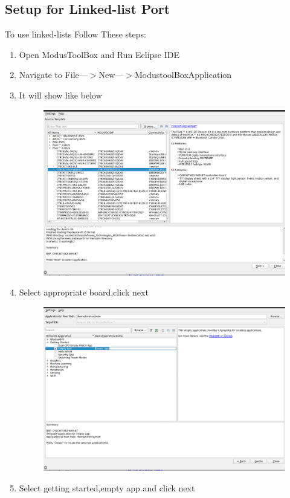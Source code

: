 \documentclass[journal,5pt,twocolumn]{IEEEtran}
\begin{document}
\subsection{\textbf{Setup for Linked-list Port}}
To use linked-lists Follow These steps:
\begin{enumerate}
\item Open ModusToolBox and Run Eclipse IDE
\item Navigate to File---$>$New---$>$ModustoolBoxApplication
\item It will show like below
\begin{figure}[h]
\includegraphics[width=\columnwidth]{../figs/modus.png}  
\end{figure}
\vspace{10mm}
\item Select appropriate board,click next
\begin{figure}[h]
\includegraphics[width=\columnwidth]{../figs/m1.png}  
\end{figure}
\item Select getting started,empty app and click next
\vspace{10mm}
\end{enumerate}
\end{document}
